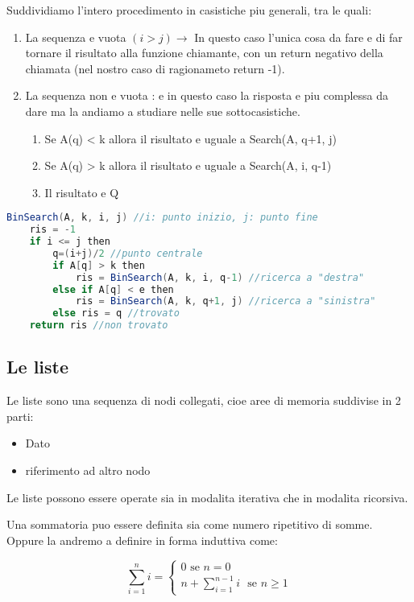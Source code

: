 Suddividiamo l'intero procedimento in casistiche piu generali, tra le quali:
\begin{enumerate}
\item La sequenza e vuota $(i>j) \rightarrow$ In questo caso l'unica cosa da fare e di far tornare il risultato alla funzione chiamante, con un return negativo della chiamata (nel nostro caso di ragionameto return -1).

\item La sequenza non e vuota : e in questo caso la risposta e piu complessa da dare ma la andiamo a studiare nelle sue sottocasistiche.
	\begin{enumerate}
	\item Se A(q) < k allora il risultato e uguale a Search(A, q+1, j)
	\item Se A(q) > k allora il risultato e uguale a Search(A, i, q-1)
	\item Il risultato e Q
	\end{enumerate}
\end{enumerate}

\begin{lstlisting}[language=Java]
BinSearch(A, k, i, j) //i: punto inizio, j: punto fine
	ris = -1
	if i <= j then
		q=(i+j)/2 //punto centrale
		if A[q] > k then
			ris = BinSearch(A, k, i, q-1) //ricerca a "destra"
		else if A[q] < e then
			ris = BinSearch(A, k, q+1, j) //ricerca a "sinistra"
		else ris = q //trovato
	return ris //non trovato
\end{lstlisting}

\subsection{Le liste}

Le liste sono una sequenza di nodi collegati, cioe aree di memoria suddivise in 2 parti:
\begin{itemize}
\item Dato
\item riferimento ad altro nodo
\end{itemize}

Le liste possono essere operate sia in modalita iterativa che in modalita ricorsiva.

Una sommatoria puo essere definita sia come numero ripetitivo di somme. Oppure la andremo a definire in forma induttiva come:

\[
\sum_{i=1}^{n}i =
\begin{cases}
    0 \text{ se } n=0\\
   	n+\sum_{i=1}^{n-1} i \text{ } \text{se } n \ge 1
\end{cases}
\]


